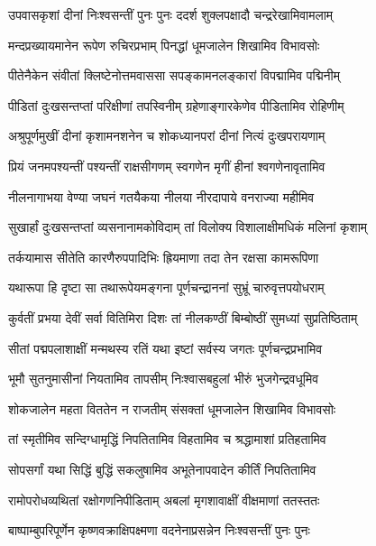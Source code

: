 \twolineshloka
{उपवासकृशां दीनां निःश्वसन्तीं पुनः पुनः}
{ददर्श शुक्लपक्षादौ चन्द्ररेखामिवामलाम्} %

\twolineshloka
{मन्दप्रख्यायमानेन रूपेण रुचिरप्रभाम्}
{पिनद्धां धूमजालेन शिखामिव विभावसोः} %

\twolineshloka
{पीतेनैकेन संवीतां क्लिष्टेनोत्तमवाससा}
{सपङ्कामनलङ्कारां विपद्मामिव पद्मिनीम्} %

\twolineshloka
{पीडितां दुःखसन्तप्तां परिक्षीणां तपस्विनीम्}
{ग्रहेणाङ्गारकेणेव पीडितामिव रोहिणीम्} %

\twolineshloka
{अश्रुपूर्णमुखीं दीनां कृशामनशनेन च}
{शोकध्यानपरां दीनां नित्यं दुःखपरायणाम्} %

\twolineshloka
{प्रियं जनमपश्यन्तीं पश्यन्तीं राक्षसीगणम्}
{स्वगणेन मृगीं हीनां श्वगणेनावृतामिव} %

\twolineshloka
{नीलनागाभया वेण्या जघनं गतयैकया}
{नीलया नीरदापाये वनराज्या महीमिव} %

\twolineshloka
{सुखार्हां दुःखसन्तप्तां व्यसनानामकोविदाम्}
{तां विलोक्य विशालाक्षीमधिकं मलिनां कृशाम्} %

\twolineshloka
{तर्कयामास सीतेति कारणैरुपपादिभिः}
{ह्रियमाणा तदा तेन रक्षसा कामरूपिणा} %

\twolineshloka
{यथारूपा हि दृष्टा सा तथारूपेयमङ्गना}
{पूर्णचन्द्राननां सुभ्रूं चारुवृत्तपयोधराम्} %

\twolineshloka
{कुर्वतीं प्रभया देवीं सर्वा वितिमिरा दिशः}
{तां नीलकण्ठीं बिम्बोष्ठीं सुमध्यां सुप्रतिष्ठिताम्} %

\twolineshloka
{सीतां पद्मपलाशाक्षीं मन्मथस्य रतिं यथा}
{इष्टां सर्वस्य जगतः पूर्णचन्द्रप्रभामिव} %

\twolineshloka
{भूमौ सुतनुमासीनां नियतामिव तापसीम्}
{निःश्वासबहुलां भीरुं भुजगेन्द्रवधूमिव} %

\twolineshloka
{शोकजालेन महता विततेन न राजतीम्}
{संसक्तां धूमजालेन शिखामिव विभावसोः} %

\twolineshloka
{तां स्मृतीमिव सन्दिग्धामृद्धिं निपतितामिव}
{विहतामिव च श्रद्धामाशां प्रतिहतामिव} %

\twolineshloka
{सोपसर्गां यथा सिद्धिं बुद्धिं सकलुषामिव}
{अभूतेनापवादेन कीर्तिं निपतितामिव} %

\twolineshloka
{रामोपरोधव्यथितां रक्षोगणनिपीडिताम्}
{अबलां मृगशावाक्षीं वीक्षमाणां ततस्ततः} %

\twolineshloka
{बाष्पाम्बुपरिपूर्णेन कृष्णवक्राक्षिपक्ष्मणा}
{वदनेनाप्रसन्नेन निःश्वसन्तीं पुनः पुनः} %


